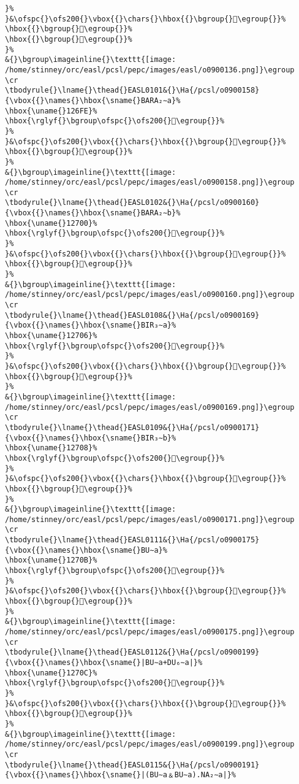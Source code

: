 \begin{verbatim}
}%
}&\ofspc{}\ofs200{}\vbox{{}\chars{}\hbox{{}\bgroup{}𒛮\egroup{}}%
\hbox{{}\bgroup{}𒛯\egroup{}}%
\hbox{{}\bgroup{}𒛰\egroup{}}%
}%
&{}\bgroup\imageinline{}\texttt{[image: /home/stinney/orc/easl/pcsl/pepc/images/easl/o0900136.png]}\egroup
\cr
\tbodyrule{}\lname{}\thead{}EASL0101&{}\Ha{/pcsl/o0900158}{\vbox{{}\names{}\hbox{\sname{}BARA₂∼a}%
\hbox{\uname{}126FE}%
\hbox{\rglyf{}\bgroup\ofspc{}\ofs200{}𒛾\egroup{}}%
}%
}&\ofspc{}\ofs200{}\vbox{{}\chars{}\hbox{{}\bgroup{}𒛾\egroup{}}%
\hbox{{}\bgroup{}𒛿\egroup{}}%
}%
&{}\bgroup\imageinline{}\texttt{[image: /home/stinney/orc/easl/pcsl/pepc/images/easl/o0900158.png]}\egroup
\cr
\tbodyrule{}\lname{}\thead{}EASL0102&{}\Ha{/pcsl/o0900160}{\vbox{{}\names{}\hbox{\sname{}BARA₂∼b}%
\hbox{\uname{}12700}%
\hbox{\rglyf{}\bgroup\ofspc{}\ofs200{}𒜀\egroup{}}%
}%
}&\ofspc{}\ofs200{}\vbox{{}\chars{}\hbox{{}\bgroup{}𒜀\egroup{}}%
\hbox{{}\bgroup{}𒜁\egroup{}}%
}%
&{}\bgroup\imageinline{}\texttt{[image: /home/stinney/orc/easl/pcsl/pepc/images/easl/o0900160.png]}\egroup
\cr
\tbodyrule{}\lname{}\thead{}EASL0108&{}\Ha{/pcsl/o0900169}{\vbox{{}\names{}\hbox{\sname{}BIR₃∼a}%
\hbox{\uname{}12706}%
\hbox{\rglyf{}\bgroup\ofspc{}\ofs200{}𒜆\egroup{}}%
}%
}&\ofspc{}\ofs200{}\vbox{{}\chars{}\hbox{{}\bgroup{}𒜇\egroup{}}%
\hbox{{}\bgroup{}𒜆\egroup{}}%
}%
&{}\bgroup\imageinline{}\texttt{[image: /home/stinney/orc/easl/pcsl/pepc/images/easl/o0900169.png]}\egroup
\cr
\tbodyrule{}\lname{}\thead{}EASL0109&{}\Ha{/pcsl/o0900171}{\vbox{{}\names{}\hbox{\sname{}BIR₃∼b}%
\hbox{\uname{}12708}%
\hbox{\rglyf{}\bgroup\ofspc{}\ofs200{}𒜈\egroup{}}%
}%
}&\ofspc{}\ofs200{}\vbox{{}\chars{}\hbox{{}\bgroup{}𒜉\egroup{}}%
\hbox{{}\bgroup{}𒜈\egroup{}}%
}%
&{}\bgroup\imageinline{}\texttt{[image: /home/stinney/orc/easl/pcsl/pepc/images/easl/o0900171.png]}\egroup
\cr
\tbodyrule{}\lname{}\thead{}EASL0111&{}\Ha{/pcsl/o0900175}{\vbox{{}\names{}\hbox{\sname{}BU∼a}%
\hbox{\uname{}1270B}%
\hbox{\rglyf{}\bgroup\ofspc{}\ofs200{}𒜋\egroup{}}%
}%
}&\ofspc{}\ofs200{}\vbox{{}\chars{}\hbox{{}\bgroup{}𒜓\egroup{}}%
\hbox{{}\bgroup{}𒜋\egroup{}}%
}%
&{}\bgroup\imageinline{}\texttt{[image: /home/stinney/orc/easl/pcsl/pepc/images/easl/o0900175.png]}\egroup
\cr
\tbodyrule{}\lname{}\thead{}EASL0112&{}\Ha{/pcsl/o0900199}{\vbox{{}\names{}\hbox{\sname{}|BU∼a+DU₆∼a|}%
\hbox{\uname{}1270C}%
\hbox{\rglyf{}\bgroup\ofspc{}\ofs200{}𒜌\egroup{}}%
}%
}&\ofspc{}\ofs200{}\vbox{{}\chars{}\hbox{{}\bgroup{}𒜌\egroup{}}%
\hbox{{}\bgroup{}𒜍\egroup{}}%
}%
&{}\bgroup\imageinline{}\texttt{[image: /home/stinney/orc/easl/pcsl/pepc/images/easl/o0900199.png]}\egroup
\cr
\tbodyrule{}\lname{}\thead{}EASL0115&{}\Ha{/pcsl/o0900191}{\vbox{{}\names{}\hbox{\sname{}|(BU∼a﹠BU∼a).NA₂∼a|}%

\end{verbatim}
